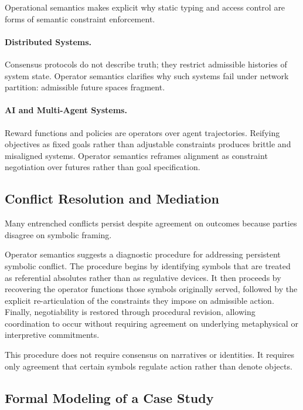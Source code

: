 \documentclass[11pt]{article}
\begin{document}
Operational semantics makes explicit why static typing and access control are
forms of semantic constraint enforcement.

\paragraph{Distributed Systems.}
Consensus protocols do not describe truth; they restrict admissible histories of
system state. Operator semantics clarifies why such systems fail under network
partition: admissible future spaces fragment.

\paragraph{AI and Multi-Agent Systems.}
Reward functions and policies are operators over agent trajectories. Reifying
objectives as fixed goals rather than adjustable constraints produces brittle and
misaligned systems. Operator semantics reframes alignment as constraint
negotiation over futures rather than goal specification.

\subsection{Conflict Resolution and Mediation}

Many entrenched conflicts persist despite agreement on outcomes because parties
disagree on symbolic framing.

Operator semantics suggests a diagnostic procedure for addressing persistent
symbolic conflict. The procedure begins by identifying symbols that are treated as
referential absolutes rather than as regulative devices. It then proceeds by
recovering the operator functions those symbols originally served, followed by
the explicit re-articulation of the constraints they impose on admissible action.
Finally, negotiability is restored through procedural revision, allowing
coordination to occur without requiring agreement on underlying metaphysical or
interpretive commitments.

This procedure does not require consensus on narratives or identities. It requires
only agreement that certain symbols regulate action rather than denote objects.

\subsection{Formal Modeling of a Case Study}
\end{document}
